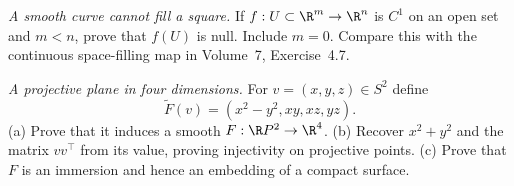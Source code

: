 \begin{exercise}[$\star$]\label{ex:minisard}
\emph{A smooth curve cannot fill a square.} If $f:U\subset\R^m\to\R^n$ is $C^1$ on an open set and $m<n$, prove that $f(U)$ is null. Include $m=0$. Compare this with the continuous space-filling map in Volume~7, Exercise~4.7.
\end{exercise}
\begin{exercise}[$\star\star$]\label{ex:rp2}
\emph{A projective plane in four dimensions.} For $v=(x,y,z)\in S^2$ define
\[
\tilde F(v)=(x^2-y^2,xy,xz,yz).
\]
(a) Prove that it induces a smooth $F:\R P^2\to\R^4$. (b) Recover $x^2+y^2$ and the matrix $vv^\top$ from its value, proving injectivity on projective points. (c) Prove that $F$ is an immersion and hence an embedding of a compact surface.
\end{exercise}

